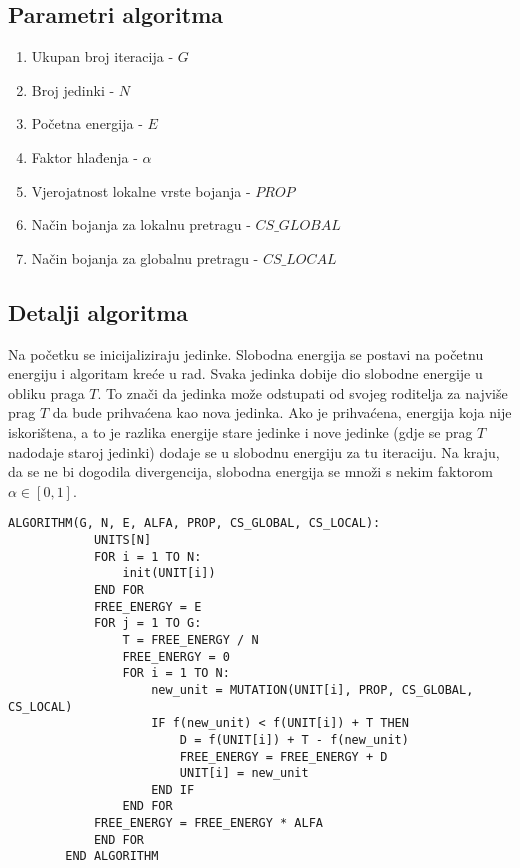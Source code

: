 \documentclass[times, utf8, diplomski, numeric]{fer}
\begin{document}
\subsection{Parametri algoritma}

\begin{enumerate}
	\item Ukupan broj iteracija - $G$
	\item Broj jedinki - $N$
	\item Početna energija - $E$
	\item Faktor hlađenja - $\alpha$
	\item Vjerojatnost lokalne vrste bojanja - $PROP$
	\item Način bojanja za lokalnu pretragu - $CS\_GLOBAL$
	\item Način bojanja za globalnu pretragu - $CS\_LOCAL$
\end{enumerate}


\subsection{Detalji algoritma}

Na početku se inicijaliziraju jedinke. Slobodna energija se postavi na početnu energiju i algoritam kreće u rad. Svaka jedinka dobije dio slobodne energije u obliku praga $T$. To znači da jedinka može odstupati od svojeg roditelja za najviše prag $T$ da bude prihvaćena kao nova jedinka. Ako je prihvaćena, energija koja nije iskorištena, a to je razlika energije stare jedinke i nove jedinke (gdje se prag $T$ nadodaje staroj jedinki) dodaje se u slobodnu energiju za tu iteraciju. Na kraju, da se ne bi dogodila divergencija, slobodna energija se množi s nekim faktorom $\alpha \in [0,1]$.  

\begin{singlespace}
	\begin{lstlisting}[caption=Pseudok\^{o}d genetskog kaljenja]
		ALGORITHM(G, N, E, ALFA, PROP, CS_GLOBAL, CS_LOCAL):
			UNITS[N]
			FOR i = 1 TO N:
				init(UNIT[i])
			END FOR
			FREE_ENERGY = E
			FOR j = 1 TO G:
				T = FREE_ENERGY / N
				FREE_ENERGY = 0
				FOR i = 1 TO N:
					new_unit = MUTATION(UNIT[i], PROP, CS_GLOBAL, CS_LOCAL)
					IF f(new_unit) < f(UNIT[i]) + T THEN
						D = f(UNIT[i]) + T - f(new_unit)
						FREE_ENERGY = FREE_ENERGY + D
						UNIT[i] = new_unit
					END IF
				END FOR
			FREE_ENERGY = FREE_ENERGY * ALFA
			END FOR
		END ALGORITHM
	\end{lstlisting}
\end{singlespace}
\end{document}
